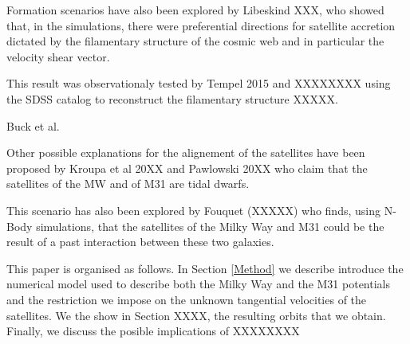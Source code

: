\documentclass[useAMS,usenatbib]{mn2e}
\begin{document}
Formation scenarios have also been explored by Libeskind XXX, who
showed that, in the simulations, there were preferential directions
for satellite accretion dictated by the filamentary structure of the
cosmic web and in particular the velocity shear vector.  

This result
was observationaly tested by Tempel 2015 and XXXXXXXX using the SDSS
catalog to reconstruct the filamentary structure XXXXX.

Buck et al. 

Other possible explanations for the alignement of the satellites have
been proposed by Kroupa et al 20XX and Pawlowski 20XX who claim that
the satellites of the MW and of M31 are tidal dwarfs. 

This scenario
has also been explored by Fouquet (XXXXX) who finds, using N-Body
simulations, that the satellites of the Milky Way and M31 could be the
result of a past interaction between these two galaxies. 


This paper is organised as follows. 
In Section \ref{Method} we describe introduce the numerical model used to describe both the Milky Way and the M31 potentials and the restriction we impose on the unknown tangential velocities of the satellites. We the show in Section XXXX, the resulting orbits that we obtain. Finally, we discuss the posible implications of XXXXXXXX   
\end{document}

